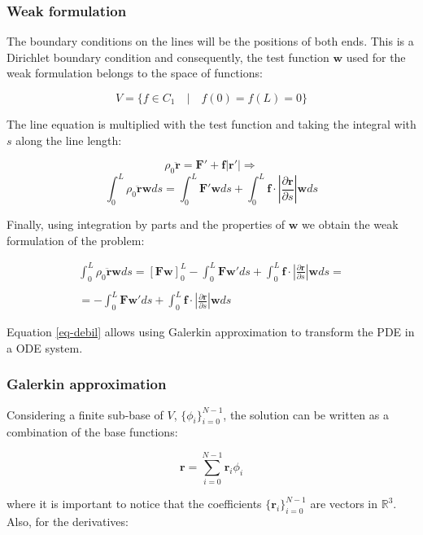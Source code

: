 \documentclass[10pt] {article}
\newcommand{\ba}{\begin{array}}
\newcommand{\ea}{\end{array}}
\newcommand{\pa}{\partial}
\begin{document}
\subsubsection{Weak formulation}

The boundary conditions on the lines will be the positions of both ends. This is a Dirichlet boundary condition and consequently, the test function $\mathbf{w}$ used for the weak formulation belongs to the space of functions:

$$V = \{ f\in C_1 \quad | \quad f(0)=f(L)=0\}$$

The line equation is multiplied with the test function and taking the integral with $s$ along the line length:

$$ \rho_{0} \ddot{\mathbf{r}} = \mathbf{F}' + \mathbf{f} \left| \mathbf{r}'\right| \Rightarrow$$
$$ \int_0^L \rho_{0}\ddot{\mathbf{r}} \mathbf{w} ds = \int_0^L \mathbf{F}'\mathbf{w} ds  + \int_0^L \mathbf{f}\cdot \left| \frac{\pa \mathbf{r}}{\pa s}\right|\mathbf{w} ds$$

Finally, using integration by parts and the properties of $\mathbf{w}$ we obtain the weak formulation of the problem:

\begin{equation}
\ba{r}
\int_0^L \rho_{0}\ddot{\mathbf{r}} \mathbf{w} ds = \left[\mathbf{F}\mathbf{w}\right]_0^L - \int_0^L \mathbf{F}\mathbf{w}' ds  + \int_0^L \mathbf{f}\cdot \left| \frac{\pa \mathbf{r}}{\pa s}\right|\mathbf{w} ds =\\
\\
= - \int_0^L \mathbf{F}\mathbf{w}' ds  + \int_0^L \mathbf{f}\cdot \left| \frac{\pa \mathbf{r}}{\pa s}\right|\mathbf{w} ds \label{eq-debil}
\ea
\end{equation}

Equation \ref{eq-debil} allows using Galerkin approximation to transform the PDE in a ODE system.

\vspace{2cm}

\subsubsection{Galerkin approximation}

Considering a finite sub-base of $V$, $\{\phi_i\}_{i=0}^{N-1}$, the solution can be written as a combination of the base functions:

$$ \mathbf{r} = \sum_{i=0}^{N-1} \mathbf{r}_{i} \phi_i$$

where it is important to notice that the coefficients $\{\mathbf{r}_{i}\}_{i=0}^{N-1}$ are vectors in $\mathbb{R}^3$. Also, for the derivatives:
\end{document}
